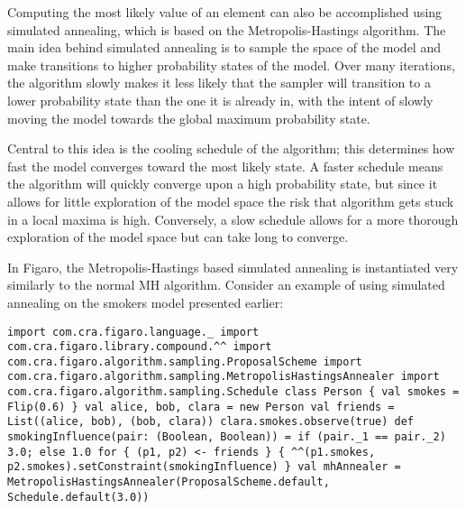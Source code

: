 Computing the most likely value of an element can also be accomplished using simulated annealing, which is based on the Metropolis-Hastings algorithm. The main idea behind simulated annealing is to sample the space of the model and make transitions to higher probability states of the model. Over many iterations, the algorithm slowly makes it less likely that the sampler will transition to a lower probability state than the one it is already in, with the intent of slowly moving the model towards the global maximum probability state.

Central to this idea is the cooling schedule of the algorithm; this determines how fast the model converges toward the most likely state. A faster schedule means the algorithm will quickly converge upon a high probability state, but since it allows for little exploration of the model space the risk that algorithm gets stuck in a local maxima is high. Conversely, a slow schedule allows for a more thorough exploration of the model space but can take long to converge.

In Figaro, the Metropolis-Hastings based simulated annealing is instantiated very similarly to the normal MH algorithm. Consider an example of using simulated annealing on the smokers model presented earlier:

\begin{flushleft}
\texttt{import com.cra.figaro.language.\_
\newline import com.cra.figaro.library.compound.\textasciicircum\textasciicircum
\newline import com.cra.figaro.algorithm.sampling.ProposalScheme
\newline import com.cra.figaro.algorithm.sampling.MetropolisHastingsAnnealer 
\newline import com.cra.figaro.algorithm.sampling.Schedule
\newline 
\newline class Person \{
\newline \tab val smokes = Flip(0.6)
\newline \}
\newline 
\newline val alice, bob, clara = new Person
\newline val friends = List((alice, bob), (bob, clara))
\newline clara.smokes.observe(true)
\newline 
\newline def smokingInfluence(pair: (Boolean, Boolean)) =
\newline \tab if (pair.\_1 == pair.\_2) 3.0; else 1.0
\newline 
\newline for \{ (p1, p2) <- friends \} \{
\newline \tab \textasciicircum\textasciicircum(p1.smokes, p2.smokes).setConstraint(smokingInfluence)
\newline \}
\newline 
\newline val mhAnnealer = MetropolisHastingsAnnealer(ProposalScheme.default, Schedule.default(3.0)) }
\end{flushleft}

